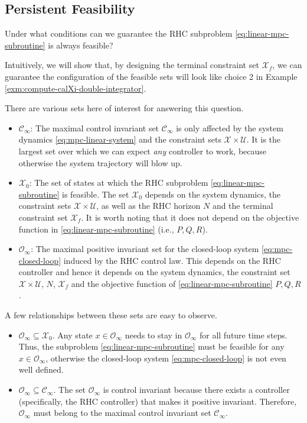\documentclass[
]{book}
\theoremstyle{definition}
\theoremstyle{definition}
\theoremstyle{definition}
\theoremstyle{definition}
\theoremstyle{remark}
\begin{document}
\hypertarget{persistent-feasibility}{%
\subsection{Persistent Feasibility}\label{persistent-feasibility}}

Under what conditions can we guarantee the RHC subproblem \eqref{eq:linear-mpc-subroutine} is always feasible?

Intuitively, we will show that, by designing the terminal constraint set \(\mathcal{X}_f\), we can guarantee the configuration of the feasible sets will look like choice 2 in Example \ref{exm:compute-calXi-double-integrator}.

There are various sets here of interest for answering this question.

\begin{itemize}
\item
  \(\mathcal{C}_{\infty}\): The maximal control invariant set \(\mathcal{C}_{\infty}\) is only affected by the system dynamics \eqref{eq:mpc-linear-system} and the constraint sets \(\mathcal{X} \times \mathcal{U}\). It is the largest set over which we can expect \emph{any} controller to work, because otherwise the system trajectory will blow up.
\item
  \(\mathcal{X}_0\): The set of states at which the RHC subproblem \eqref{eq:linear-mpc-subroutine} is feasible. The set \(\mathcal{X}_0\) depends on the system dynamics, the constraint sets \(\mathcal{X} \times \mathcal{U}\), as well as the RHC horizon \(N\) and the terminal constraint set \(\mathcal{X}_f\). It is worth noting that it does not depend on the objective function in \eqref{eq:linear-mpc-subroutine} (i.e., \(P,Q,R\)).
\item
  \(\mathcal{O}_{\infty}\): The maximal positive invariant set for the closed-loop system \eqref{eq:mpc-closed-loop} induced by the RHC control law. This depends on the RHC controller and hence it depends on the system dynamics, the constraint set \(\mathcal{X} \times \mathcal{U}\), \(N\), \(\mathcal{X}_f\) and the objective function of \eqref{eq:linear-mpc-subroutine} \(P,Q,R\).
\end{itemize}

A few relationships between these sets are easy to observe.

\begin{itemize}
\item
  \(\mathcal{O}_{\infty} \subseteq \mathcal{X}_0\). Any state \(x \in \mathcal{O}_{\infty}\) needs to stay in \(\mathcal{O}_{\infty}\) for all future time steps. Thus, the subproblem \eqref{eq:linear-mpc-subroutine} must be feasible for any \(x \in \mathcal{O}_{\infty}\), otherwise the closed-loop system \eqref{eq:mpc-closed-loop} is not even well defined.
\item
  \(\mathcal{O}_{\infty} \subseteq \mathcal{C}_{\infty}\). The set \(\mathcal{O}_{\infty}\) is control invariant because there exists a controller (specifically, the RHC controller) that makes it positive invariant. Therefore, \(\mathcal{O}_{\infty}\) must belong to the maximal control invariant set \(\mathcal{C}_{\infty}\).
\end{itemize}
\end{document}
